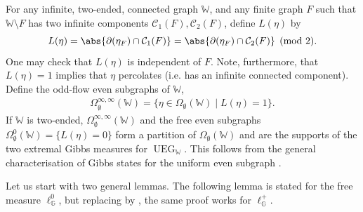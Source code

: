 \documentclass[article,11pt,reqno]{amsart}
\DeclareMathOperator*{\UEG}{UEG}
\begin{document}
For  any infinite, two-ended, connected graph $\mathbb{W}$, and any finite graph $F$ such that $\mathbb{W} \setminus F$ has two infinite components $\mathcal{C}_1(F),\mathcal{C}_2(F)$, define $L(\eta)$ by
$$
L(\eta) = \abs{\partial(\eta_F) \cap \mathcal{C}_1(F)} =\abs{\partial(\eta_F) \cap \mathcal{C}_2(F)} \pmod{2}.
$$
One may check that $L(\eta)$ is independent of $F$. Note, furthermore, that $L(\eta)=1$ implies that $\eta$ percolates (i.e. has an infinite connected component).  Define the odd-flow even subgraphs of $\mathbb{W}$,
\begin{align*}
    \Omega_\emptyset^{\infty,\infty}(\mathbb{W}) =  \{ \eta \in \Omega_\emptyset(\mathbb{W}) \mid  L(\eta) = 1 \}.
\end{align*}
If $\mathbb{W}$ is two-ended, $\Omega_{\emptyset}^{\infty,\infty}(\mathbb{W})$ and the free even subgraphs $\Omega_{\emptyset}^{0}(\mathbb{W})=\{L(\eta)=0\}$ form a partition of $\Omega_{\emptyset}(\mathbb{W})$ and are the supports of the two extremal Gibbs measures for $\UEG_{\mathbb{W}}.$ This follows from the general characterisation of Gibbs states for the uniform even subgraph
\cite[Theorem 3.14, Proposition 3.16]{hansen2023uniform}.


Let us start with two general lemmas. The following lemma is stated for the free measure $\ell^0_{\mathbb{G}}$, but replacing \cite[Proposition A.2]{hansen2026supercriticalloopo1random} by  \cite[Proposition A.4]{hansen2026supercriticalloopo1random}, the same proof works for $\ell^+_{\mathbb{G}}$.
\end{document}
